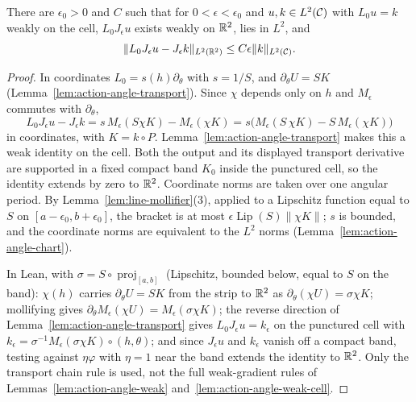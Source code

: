 \begin{lemma}
\label{lem:transversal-mollifier-commutator}
\leanok
There are $\epsilon_0>0$ and $C$ such that for $0<\epsilon<\epsilon_0$ and $u,k\in L^2(\mathcal{C})$ with
$L_0u=k$ weakly on the cell, $L_0J_\epsilon u$ exists weakly on $\mathbb{R}^2$, lies in $L^2$, and
\[
  \|L_0J_\epsilon u-J_\epsilon k\|_{L^2(\mathbb{R}^2)}\le C\epsilon\|k\|_{L^2(\mathcal{C})}.
\]
\end{lemma}

\begin{proof}
\leanok
In coordinates $L_0=s(h)\partial_\theta$ with $s=1/S$, and $\partial_\theta U=SK$
(Lemma~\ref{lem:action-angle-transport}). Since $\chi$ depends only on $h$ and $M_\epsilon$ commutes
with $\partial_\theta$,
\[
  L_0J_\epsilon u-J_\epsilon k=s\,M_\epsilon(S\chi K)-M_\epsilon(\chi K)=s\bigl(M_\epsilon(S\,\chi K)-S\,M_\epsilon(\chi K)\bigr)
\]
in coordinates, with $K=k\circ P$. Lemma~\ref{lem:action-angle-transport}
makes this a weak identity on the cell. Both the output and its displayed
transport derivative are supported in a fixed compact band $K_0$ inside
the punctured cell, so the identity extends by zero to $\mathbb{R}^2$.
Coordinate norms are taken over one angular period. By
Lemma~\ref{lem:line-mollifier}(3), applied to a Lipschitz function equal to $S$ on
$[a-\epsilon_0,b+\epsilon_0]$, the bracket is at most $\epsilon\operatorname{Lip}(S)\|\chi K\|$; $s$ is bounded,
and the coordinate norms are equivalent to the $L^2$ norms (Lemma~\ref{lem:action-angle-chart}).

In Lean, with $\sigma=S\circ\operatorname{proj}_{[a,b]}$ (Lipschitz, bounded below, equal to
$S$ on the band): $\chi(h)$ carries $\partial_\theta U=SK$ from the strip to $\mathbb{R}^2$ as
$\partial_\theta(\chi U)=\sigma\chi K$; mollifying gives
$\partial_\theta M_\epsilon(\chi U)=M_\epsilon(\sigma\chi K)$; the reverse direction of
Lemma~\ref{lem:action-angle-transport} gives $L_0J_\epsilon u=k_\epsilon$ on the punctured cell
with $k_\epsilon=\sigma^{-1}M_\epsilon(\sigma\chi K)\circ(h,\theta)$; and since $J_\epsilon u$
and $k_\epsilon$ vanish off a compact band, testing against $\eta\varphi$ with $\eta=1$ near
the band extends the identity to $\mathbb{R}^2$. Only the transport chain rule is used, not the
full weak-gradient rules of Lemmas~\ref{lem:action-angle-weak}
and~\ref{lem:action-angle-weak-cell}.
\end{proof}

